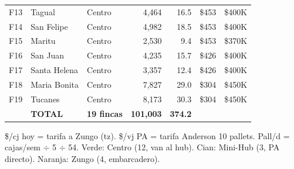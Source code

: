\documentclass[aspectratio=169, 10pt]{beamer}
\begin{document}
\begin{frame}
\begin{center}
\begin{tabular}{c l l r r r r}
    \rowcolor{verdeclaro}
    F13 & Tagual        & \textcolor{verde}{Centro}      & 4,464 & 16.5 & \$453 & \$400K \\
    \rowcolor{verdeclaro}
    F14 & San Felipe    & \textcolor{verde}{Centro}      & 4,982 & 18.5 & \$453 & \$400K \\
    \rowcolor{verdeclaro}
    F15 & Maritu        & \textcolor{verde}{Centro}      & 2,530 &  9.4 & \$453 & \$370K \\
    \rowcolor{verdeclaro}
    F16 & San Juan      & \textcolor{verde}{Centro}      & 4,235 & 15.7 & \$426 & \$400K \\
    \rowcolor{verdeclaro}
    F17 & Santa Helena  & \textcolor{verde}{Centro}      & 3,357 & 12.4 & \$426 & \$400K \\
    \rowcolor{verdeclaro}
    F18 & Maria Bonita  & \textcolor{verde}{Centro}      & 7,827 & 29.0 & \$304 & \$450K \\
    \rowcolor{verdeclaro}
    F19 & Tucanes       & \textcolor{verde}{Centro}      & 8,173 & 30.3 & \$304 & \$450K \\
    \midrule
    & \textbf{TOTAL} & \textbf{19 fincas} & \textbf{101,003} & \textbf{374.2} & & \\
    \bottomrule
\end{tabular}
\end{center}

\vspace{1pt}
{\tiny\color{gris} \$/cj hoy = tarifa a Zungo (tz). \$/vj PA = tarifa Anderson 10 pallets. Pall/d = cajas/sem $\div$ 5 $\div$ 54.
\textcolor{verde}{Verde}: Centro (12, van al hub). \textcolor{cian}{Cian}: Mini-Hub (3, PA directo). \textcolor{naranja}{Naranja}: Zungo (4, embarcadero).}
\end{frame}
\end{document}
